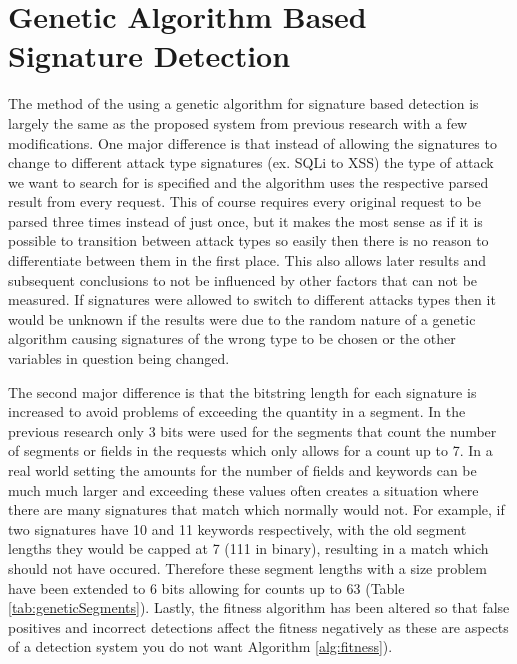 \section{Genetic Algorithm Based Signature Detection}\label{sec:genIntro}

The method of the using a genetic algorithm for signature based detection is largely the same as the proposed system from previous research with a few modifications. \cite{mainPaper}  One major difference is that instead of allowing the signatures to change to different attack type signatures (ex. SQLi to XSS) the type of attack we want to search for is specified and the algorithm uses the respective parsed result from every request.  This of course requires every original request to be parsed three times instead of just once, but it makes the most sense as if it is possible to transition between attack types so easily then there is no reason to differentiate between them in the first place.  This also allows later results and subsequent conclusions to not be influenced by other factors that can not be measured.  If signatures were allowed to switch to different attacks types then it would be unknown if the results were due to the random nature of a genetic algorithm causing signatures of the wrong type to be chosen or the other variables in question being changed.  

The second major difference is that the bitstring length for each signature is increased to avoid problems of exceeding the quantity in a segment.  In the previous research only 3 bits were used for the segments that count the number of segments or fields in the requests which only allows for a count up to 7.  In a real world setting the amounts for the number of fields and keywords can be much much larger and exceeding these values often creates a situation where there are many signatures that match which normally would not.  For example, if two signatures have 10 and 11 keywords respectively, with the old segment lengths they would be capped at 7  (111 in binary), resulting in a match which should not have occured.  Therefore these segment lengths with a size problem have been extended to 6 bits allowing for counts up to 63 (Table \ref{tab:geneticSegments}).  Lastly, the fitness algorithm has been altered so that false positives and incorrect detections affect the fitness negatively as these are aspects of a detection system you do not want Algorithm \ref{alg:fitness}).

